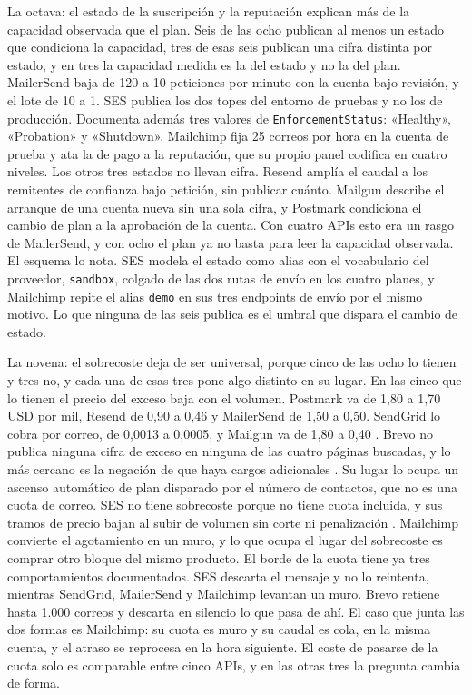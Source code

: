 La octava: el estado de la suscripción y la reputación explican más de la capacidad observada que el plan.
Seis de las ocho publican al menos un estado que condiciona la capacidad, tres de esas seis publican una cifra distinta por estado, y en tres la capacidad medida es la del estado y no la del plan.
MailerSend baja de 120 a 10 peticiones por minuto con la cuenta bajo revisión, y el lote de 10 a 1.
SES publica los dos topes del entorno de pruebas y no los de producción.
Documenta además tres valores de \texttt{EnforcementStatus}: «Healthy», «Probation» y «Shutdown».
Mailchimp fija 25 correos por hora en la cuenta de prueba y ata la de pago a la reputación, que su propio panel codifica en cuatro niveles.
Los otros tres estados no llevan cifra.
Resend amplía el caudal a los remitentes de confianza bajo petición, sin publicar cuánto.
Mailgun describe el arranque de una cuenta nueva sin una sola cifra, y Postmark condiciona el cambio de plan a la aprobación de la cuenta.
Con cuatro APIs esto era un rasgo de MailerSend, y con ocho el plan ya no basta para leer la capacidad observada.
El esquema lo nota.
SES modela el estado como alias con el vocabulario del proveedor, \texttt{sandbox}, colgado de las dos rutas de envío en los cuatro planes, y Mailchimp repite el alias \texttt{demo} en sus tres endpoints de envío por el mismo motivo.
Lo que ninguna de las seis publica es el umbral que dispara el cambio de estado.

La novena: el sobrecoste deja de ser universal, porque cinco de las ocho lo tienen y tres no, y cada una de esas tres pone algo distinto en su lugar.
En las cinco que lo tienen el precio del exceso baja con el volumen.
Postmark va de 1,80 a 1,70 USD por mil, Resend de 0,90 a 0,46 y MailerSend de 1,50 a 0,50.
SendGrid lo cobra por correo, de 0,0013 a 0,0005, y Mailgun va de 1,80 a 0,40 \citep{mailgunpricing}.
Brevo no publica ninguna cifra de exceso en ninguna de las cuatro páginas buscadas, y lo más cercano es la negación de que haya cargos adicionales \citep{brevopricing}.
Su lugar lo ocupa un ascenso automático de plan disparado por el número de contactos, que no es una cuota de correo.
SES no tiene sobrecoste porque no tiene cuota incluida, y sus tramos de precio bajan al subir de volumen sin corte ni penalización \citep{sespricing}.
Mailchimp convierte el agotamiento en un muro, y lo que ocupa el lugar del sobrecoste es comprar otro bloque del mismo producto.
El borde de la cuota tiene ya tres comportamientos documentados.
SES descarta el mensaje y no lo reintenta, mientras SendGrid, MailerSend y Mailchimp levantan un muro. Brevo retiene hasta 1.000 correos y descarta en silencio lo que pasa de ahí.
El caso que junta las dos formas es Mailchimp: su cuota es muro y su caudal es cola, en la misma cuenta, y el atraso se reprocesa en la hora siguiente.
El coste de pasarse de la cuota solo es comparable entre cinco APIs, y en las otras tres la pregunta cambia de forma.

